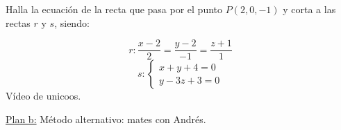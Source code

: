 \begin{problem}
Halla la ecuación de la recta que pasa por el punto $P(2,0,-1)$ y corta a las rectas $r$ y $s$, siendo:

\[r:\frac{x-2}{2} = \frac{y-2}{-1} = \frac{z+1}{1}\]
\[s:\begin{cases}x+y+4=0\\y-3z+3=0\end{cases}\]
\solution
Vídeo de unicoos.

\ul{Plan b:} Método alternativo: mates con Andrés.
\end{problem}
